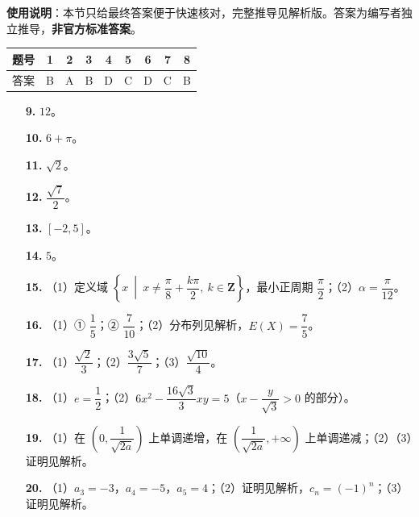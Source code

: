 
\begin{gknotice}
\textbf{使用说明}：本节只给最终答案便于快速核对，完整推导见解析版。答案为编写者独立推导，\textbf{非官方标准答案}。
\end{gknotice}

\begin{center}\begin{tabular}{ccccccccc}
\toprule
题号 & 1 & 2 & 3 & 4 & 5 & 6 & 7 & 8 \\
\midrule
答案 & B & A & B & D & C & D & C & B \\
\bottomrule
\end{tabular}\end{center}

\begin{itemize}[leftmargin=2.6em]
  \item[\textbf{9.}] $12$。
  \item[\textbf{10.}] $6+\pi$。
  \item[\textbf{11.}] $\sqrt2$。
  \item[\textbf{12.}] $\dfrac{\sqrt7}{2}$。
  \item[\textbf{13.}] $[-2,5]$。
  \item[\textbf{14.}] $5$。
\end{itemize}

\begin{itemize}[leftmargin=2.6em]
  \item[\textbf{15.}] （1）定义域 $\left\{x\ \middle|\ x\neq\dfrac{\pi}{8}+\dfrac{k\pi}{2},\ k\in\mathbf{Z}\right\}$，最小正周期 $\dfrac{\pi}{2}$；（2）$\alpha=\dfrac{\pi}{12}$。
  \item[\textbf{16.}] （1）① $\dfrac15$；② $\dfrac{7}{10}$；（2）分布列见解析，$E(X)=\dfrac75$。
  \item[\textbf{17.}] （1）$\dfrac{\sqrt2}{3}$；（2）$\dfrac{3\sqrt5}{7}$；（3）$\dfrac{\sqrt{10}}{4}$。
  \item[\textbf{18.}] （1）$e=\dfrac12$；（2）$6x^2-\dfrac{16\sqrt3}{3}xy=5$（$x-\dfrac{y}{\sqrt3}>0$ 的部分）。
  \item[\textbf{19.}] （1）在 $\left(0,\dfrac{1}{\sqrt{2a}}\right)$ 上单调递增，在 $\left(\dfrac{1}{\sqrt{2a}},+\infty\right)$ 上单调递减；（2）（3）证明见解析。
  \item[\textbf{20.}] （1）$a_3=-3$，$a_4=-5$，$a_5=4$；（2）证明见解析，$c_n=(-1)^n$；（3）证明见解析。
\end{itemize}
